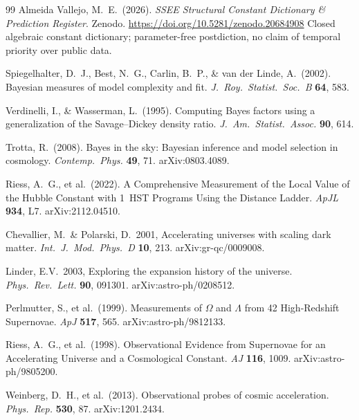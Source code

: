\documentclass[12pt,a4paper]{article}
\begin{document}
\begin{thebibliography}{99}
Almeida Vallejo, M.~E.\ (2026).
\textit{SSEE Structural Constant Dictionary \& Prediction Register}.
Zenodo. \url{https://doi.org/10.5281/zenodo.20684908}
Closed algebraic constant dictionary; parameter-free postdiction, no claim of
temporal priority over public data.

Spiegelhalter, D.~J., Best, N.~G., Carlin, B.~P., \& van der Linde, A.\ (2002).
Bayesian measures of model complexity and fit.
\textit{J.~Roy.\ Statist.\ Soc.~B} \textbf{64}, 583.

Verdinelli, I., \& Wasserman, L.\ (1995).
Computing Bayes factors using a generalization of the Savage--Dickey density ratio.
\textit{J.~Am.\ Statist.\ Assoc.} \textbf{90}, 614.

Trotta, R.\ (2008).
Bayes in the sky: Bayesian inference and model selection in cosmology.
\textit{Contemp.\ Phys.} \textbf{49}, 71. arXiv:0803.4089.

Riess, A.~G., et al.\ (2022).
A Comprehensive Measurement of the Local Value of the Hubble Constant with
1~HST Programs Using the Distance Ladder.
\textit{ApJL} \textbf{934}, L7. arXiv:2112.04510.

Chevallier, M.\ \& Polarski, D.\ 2001,
Accelerating universes with scaling dark matter.
\textit{Int.\ J.\ Mod.\ Phys.\ D} \textbf{10}, 213. arXiv:gr-qc/0009008.

Linder, E.V.\ 2003,
Exploring the expansion history of the universe.
\textit{Phys.\ Rev.\ Lett.} \textbf{90}, 091301. arXiv:astro-ph/0208512.

Perlmutter, S., et al.\ (1999).
Measurements of $\Omega$ and $\Lambda$ from 42 High-Redshift Supernovae.
\textit{ApJ} \textbf{517}, 565. arXiv:astro-ph/9812133.

Riess, A.~G., et al.\ (1998).
Observational Evidence from Supernovae for an Accelerating Universe and a Cosmological Constant.
\textit{AJ} \textbf{116}, 1009. arXiv:astro-ph/9805200.

Weinberg, D.~H., et al.\ (2013).
Observational probes of cosmic acceleration.
\textit{Phys.\ Rep.} \textbf{530}, 87. arXiv:1201.2434.


\end{thebibliography}
\end{document}
